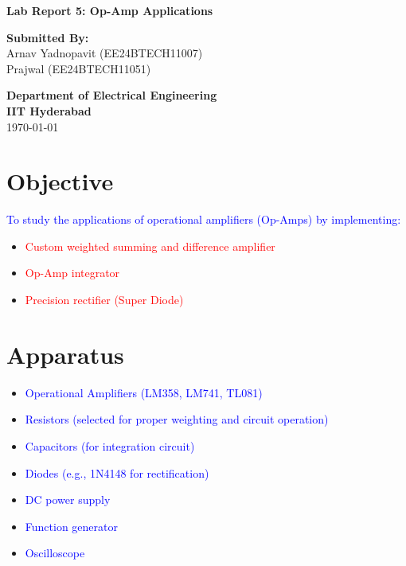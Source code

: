 \documentclass[a4paper,12pt]{article}
\begin{document}
\begin{titlepage}
    \centering
    \vspace*{1cm}
    \Huge \textbf{Lab Report 5: Op-Amp Applications}
    \vspace{1.5cm}
    
    \LARGE \textbf{Submitted By:}\\
    \Large Arnav Yadnopavit (EE24BTECH11007)\\
    Prajwal (EE24BTECH11051)
    
    \vfill
    
    \Large \textbf{Department of Electrical Engineering}\\
    \Large \textbf{IIT Hyderabad}\\
    \Large \today
    
    \vspace*{2cm}
\end{titlepage}

\section*{Objective}
\textcolor{blue}{To study the applications of operational amplifiers (Op-Amps) by implementing:}
\begin{itemize}
    \item \textcolor{red}{Custom weighted summing and difference amplifier}
    \item \textcolor{red}{Op-Amp integrator}
    \item \textcolor{red}{Precision rectifier (Super Diode)}
\end{itemize}

\section*{Apparatus}
\begin{itemize}
    \item \textcolor{blue}{Operational Amplifiers (LM358, LM741, TL081)}
    \item \textcolor{blue}{Resistors (selected for proper weighting and circuit operation)}
    \item \textcolor{blue}{Capacitors (for integration circuit)}
    \item \textcolor{blue}{Diodes (e.g., 1N4148 for rectification)}
    \item \textcolor{blue}{DC power supply}
    \item \textcolor{blue}{Function generator}
    \item \textcolor{blue}{Oscilloscope}
\end{itemize}
\end{document}
